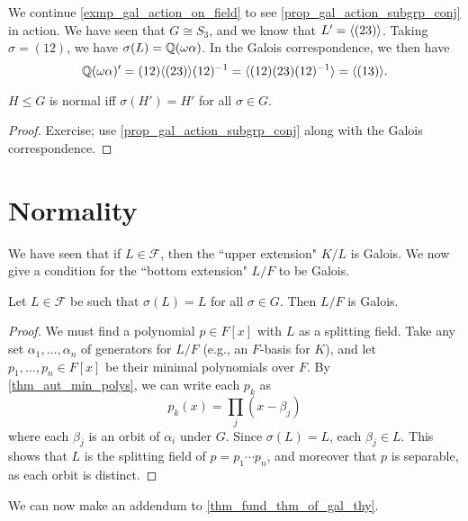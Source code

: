\begin{example}
    We continue \cref{exmp_gal_action_on_field} to see \cref{prop_gal_action_subgrp_conj} in action. We have seen that $G \cong S_3$, and we know that $L' = \langle {(23)} \rangle$. Taking $\sigma = (12)$, we have $\sigma(L) = \mathbb{{Q}}(\omega \alpha)$. In the Galois correspondence, we then have
    \[
        \mathbb{{Q}}(\omega \alpha)' = (12) \langle {(23)} \rangle (12)^{-1} = \langle {(12)(23)(12)^{-1}} \rangle = \langle {(13)} \rangle.
    \]
\end{example}

\begin{corollary}
\label{cor_normal_subgrp_of_gal_grp_iff}
    $H \leq G$ is normal iff $\sigma(H') = H'$ for all $\sigma \in G$.
\end{corollary}

\begin{proof}
    Exercise; use \cref{prop_gal_action_subgrp_conj} along with the Galois correspondence.
\end{proof}

\section{Normality}

We have seen that if $L \in \mathcal{F}$, then the ``upper extension" $K/L$ is Galois. We now give a condition for the ``bottom extension" $L/F$ to be Galois.

\begin{lemma}
\label{lem_cond_for_bottom_ext_gal}
    Let $L \in \mathcal{F}$ be such that $\sigma(L) = L$ for all $\sigma \in G$. Then $L/F$ is Galois.
\end{lemma}

\begin{proof}
    We must find a polynomial $p \in F[x]$ with $L$ as a splitting field. Take any set $\alpha_1, \ldots, \alpha_n$ of generators for $L/F$ (e.g., an $F$-basis for $K$), and let $p_1, \ldots, p_n \in F[x]$ be their minimal polynomials over $F$. By \cref{thm_aut_min_polys}, we can write each $p_k$ as
    \[
        p_k(x) = \prod_{j} (x - \beta_j)
    \]
    where each $\beta_j$ is an orbit of $\alpha_i$ under $G$. Since $\sigma(L) = L$, each $\beta_j \in L$. This shows that $L$ is the splitting field of $p = p_1 \cdots p_n$, and moreover that $p$ is separable, as each orbit is distinct.
\end{proof}

We can now make an addendum to \cref{thm_fund_thm_of_gal_thy}.

